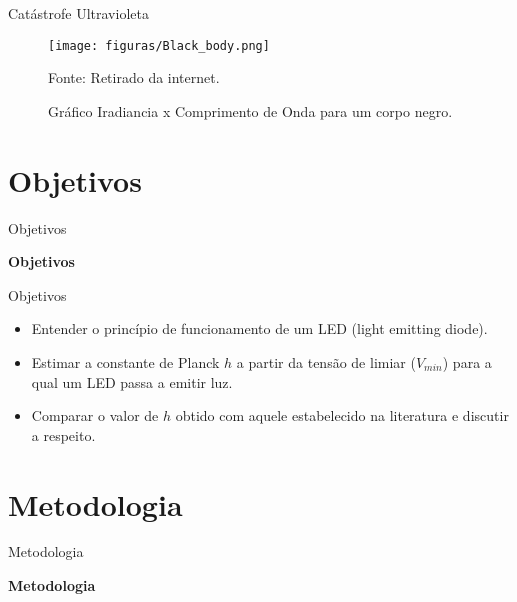 \documentclass[aspectratio=169,12.5pt,xcolor=dvipsnames]{beamer}
\begin{document}
\begin{frame}{Catástrofe Ultravioleta}

        \begin{center}
        \begin{figure}
        \caption{Gráfico Iradiancia x Comprimento de Onda para um corpo negro.}
        \vspace*{-0.20cm}
        \texttt{[image: figuras/Black\_body.png]}\par
        {\scriptsize Fonte: Retirado da internet.}
        \end{figure}
        \end{center}
    
\end{frame}


\section{Objetivos}
\begin{frame}{Objetivos}
    \Huge{\centerline{\textbf{Objetivos}}}
\end{frame}

\begin{frame}{Objetivos}

\vspace{1\baselineskip}

    \begin{itemize}
        \item Entender o princípio de funcionamento de um LED (light emitting diode).
        
        \item Estimar a constante de Planck $h$ a partir da tensão de limiar ($V_{min}$) para a qual um LED
passa a emitir luz.

        \item Comparar o valor de $h$ obtido com aquele estabelecido na literatura e discutir a respeito.
        
    \end{itemize}
\end{frame}
\section{Metodologia}
\begin{frame}{Metodologia}
    \Huge{\centerline{\textbf{Metodologia}}}
\end{frame}
\end{document}
